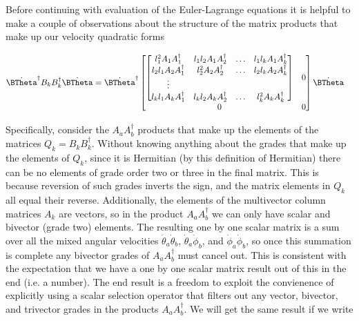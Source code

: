 Before continuing with evaluation of the Euler-Lagrange equations it is helpful to make a couple of observations about the structure of the matrix products that make up our velocity quadratic forms

\begin{align}\label{eqn:multiPendulumSpherical2:boo8}
\dot{\BTheta}^\dagger
B_k B_k^\dagger
\dot{\BTheta}
&=
\dot{\BTheta}^\dagger
\begin{bmatrix}
\begin{bmatrix}
l_1^2 A_1 A_1^\dagger & l_1 l_2 A_1 A_2^\dagger & \hdots & l_1 l_k A_1 A_k^\dagger \\
l_2 l_1 A_2 A_1^\dagger & l_2^2 A_2 A_2^\dagger & \hdots & l_2 l_k A_2 A_k^\dagger \\
\vdots \\
l_k l_1 A_k A_1^\dagger & l_k l_2 A_k A_2^\dagger & \hdots & l_k^2 A_k A_k^\dagger
\end{bmatrix} & 0 \\
0 & 0
\end{bmatrix}
\dot{\BTheta}
\end{align}

Specifically, consider the $A_a A_b^\dagger$ products that make up the elements of the matrices $Q_k = B_k B_k^\dagger$.  Without knowing anything about the grades that make up the elements of $Q_k$, since it is Hermitian (by this definition of Hermitian) there can be no elements of grade order two or three in the final matrix.  This is because reversion of such grades inverts the sign, and the matrix elements in $Q_k$ all equal their reverse.  Additionally, the elements of the multivector column matrices $A_k$ are vectors, so in the product $A_a A_b^\dagger$ we can only have scalar and bivector (grade two) elements.  The resulting one by one scalar matrix is a sum over all the mixed angular velocities $\dot{\theta}_a \dot{\theta}_b$, $\dot{\theta}_a \dot{\phi}_b$, and $\dot{\phi}_a \dot{\phi}_b$, so once this summation is complete any bivector grades of $A_a A_b^\dagger$ must cancel out.  This is consistent with the expectation that we have a one by one scalar matrix result out of this in the end (i.e. a number).  The end result is a freedom to exploit the convienence of explicitly using a scalar selection operator that filters out any vector, bivector, and trivector grades in the products $A_a A_b^\dagger$.  We will get the same result if we write

